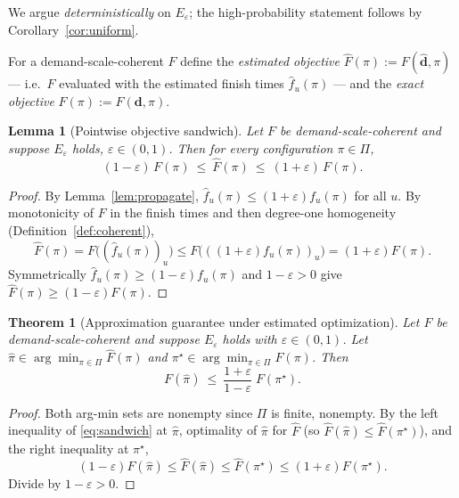 \documentclass{amsart}
\newtheorem{theorem}{Theorem}
\newtheorem{lemma}{Lemma}
\theoremstyle{definition}
\begin{document}
We argue \emph{deterministically} on $E_\varepsilon$; the high-probability
statement follows by Corollary~\ref{cor:uniform}.

For a demand-scale-coherent $F$ define the \emph{estimated objective}
$\widehat F(\pi):=F(\widehat{\mathbf d},\pi)$ — i.e.\ $F$ evaluated with the
estimated finish times $\widehat f_u(\pi)$ — and the \emph{exact objective}
$F(\pi):=F(\mathbf d,\pi)$.

\begin{lemma}[Pointwise objective sandwich]\label{lem:sandwich}
Let $F$ be demand-scale-coherent and suppose $E_\varepsilon$ holds,
$\varepsilon\in(0,1)$. Then for every configuration $\pi\in\Pi$,
\begin{equation}\label{eq:sandwich}
(1-\varepsilon)\,F(\pi)\ \le\ \widehat F(\pi)\ \le\ (1+\varepsilon)\,F(\pi).
\end{equation}
\end{lemma}

\begin{proof}
By Lemma~\ref{lem:propagate}, $\widehat f_u(\pi)\le(1+\varepsilon)f_u(\pi)$ for
all $u$. By monotonicity of $F$ in the finish times and then degree-one
homogeneity (Definition~\ref{def:coherent}),
\[
\widehat F(\pi)=F\big((\widehat f_u(\pi))_u\big)\le F\big(((1+\varepsilon)f_u(\pi))_u\big)
=(1+\varepsilon)F(\pi).
\]
Symmetrically $\widehat f_u(\pi)\ge(1-\varepsilon)f_u(\pi)$ and $1-\varepsilon>0$
give $\widehat F(\pi)\ge(1-\varepsilon)F(\pi)$.
\end{proof}

\begin{theorem}[Approximation guarantee under estimated optimization]\label{thm:main}
Let $F$ be demand-scale-coherent and suppose $E_\varepsilon$ holds with
$\varepsilon\in(0,1)$. Let
$\hat\pi\in\arg\min_{\pi\in\Pi}\widehat F(\pi)$ and
$\pi^\star\in\arg\min_{\pi\in\Pi}F(\pi)$. Then
\begin{equation}\label{eq:approx}
F(\hat\pi)\ \le\ \frac{1+\varepsilon}{1-\varepsilon}\;F(\pi^\star).
\end{equation}
\end{theorem}

\begin{proof}
Both arg-min sets are nonempty since $\Pi$ is finite, nonempty. By the left
inequality of \eqref{eq:sandwich} at $\hat\pi$, optimality of $\hat\pi$ for
$\widehat F$ (so $\widehat F(\hat\pi)\le\widehat F(\pi^\star)$), and the right
inequality at $\pi^\star$,
\[
(1-\varepsilon)F(\hat\pi)\le\widehat F(\hat\pi)\le\widehat F(\pi^\star)
\le(1+\varepsilon)F(\pi^\star).
\]
Divide by $1-\varepsilon>0$.
\end{proof}
\end{document}
